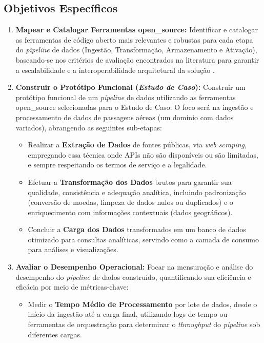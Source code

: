 \subsection{Objetivos Específicos}
\begin{enumerate}
    \item \textbf{Mapear e Catalogar Ferramentas \acs{open_source}:} Identificar e catalogar as ferramentas de código aberto mais relevantes e robustas para cada etapa do \textit{pipeline} de dados (Ingestão, Transformação, Armazenamento e Ativação), baseando-se nos critérios de avaliação encontrados na literatura para garantir a escalabilidade e a interoperabilidade arquitetural da solução \cite[]{boulahia2024, murarka2024, septian2019}.

    \item \textbf{Construir o Protótipo Funcional (\textit{Estudo de Caso}):} Construir um protótipo funcional de um \textit{pipeline} de dados utilizando as ferramentas \acs{open_source} selecionadas para o Estudo de Caso. O foco será na ingestão e processamento de dados de passagens aéreas (um domínio com dados variados), abrangendo as seguintes sub-etapas:
    \begin{itemize}
        \item Realizar a \textbf{Extração de Dados} de fontes públicas, via \textit{web scraping}, empregando essa técnica onde APIs não são disponíveis ou são limitadas, e sempre respeitando os termos de serviço e a legalidade.
        \item Efetuar a \textbf{Transformação dos Dados} brutos para garantir sua qualidade, consistência e adequação analítica, incluindo padronização (conversão de moedas, limpeza de dados nulos ou duplicados) e o enriquecimento com informações contextuais (dados geográficos).
        \item Concluir a \textbf{Carga dos Dados} transformados em um banco de dados otimizado para consultas analíticas, servindo como a camada de consumo para análises e visualizações.
    \end{itemize}

    \item \textbf{Avaliar o Desempenho Operacional:} Focar na mensuração e análise do desempenho do \textit{pipeline} de dados construído, quantificando sua eficiência e eficácia por meio de métricas-chave:
    \begin{itemize}
        \item Medir o \textbf{Tempo Médio de Processamento} por lote de dados, desde o início da ingestão até a carga final, utilizando logs de tempo ou ferramentas de orquestração para determinar o \textit{throughput} do \textit{pipeline} sob diferentes cargas.
        

\end{itemize}
\end{enumerate}

